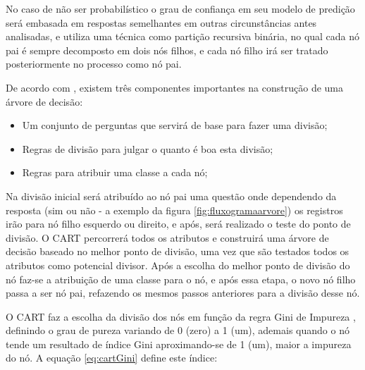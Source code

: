 No caso de não ser probabilístico o grau de confiança em seu modelo de predição será embasada em respostas semelhantes em outras circunstâncias antes analisadas, e utiliza uma técnica como partição recursiva binária, no qual cada nó pai é sempre decomposto em dois nós filhos, e cada nó filho irá ser tratado posteriormente no processo como nó pai.

De acordo com , existem três componentes importantes na construção de uma árvore de decisão:

\begin{itemize}
[noitemsep]
 \item Um conjunto de perguntas que servirá de base para fazer uma divisão;
 \item Regras de divisão para julgar o quanto é boa esta divisão;
 \item Regras para atribuir uma classe a cada nó;
\end{itemize}

Na divisão inicial será atribuído ao nó pai uma questão onde dependendo da resposta (sim ou não - a exemplo da figura \ref{fig:fluxogramaarvore}) os registros irão para nó filho esquerdo ou direito, e após, será realizado o teste do ponto de divisão. O CART percorrerá todos os atributos e construirá uma árvore de decisão baseado no melhor ponto de divisão, uma vez que são testados todos os atributos como potencial divisor. Após a escolha do melhor ponto de divisão do nó faz-se a atribuição de uma classe para o nó, e após essa etapa, o novo nó filho passa a ser nó pai, refazendo os mesmos passos anteriores para a divisão desse nó.

O CART faz a escolha da divisão dos nós em função da regra Gini de Impureza  \cite{breiman1984}, definindo o grau de pureza variando de 0 (zero) a 1 (um), ademais quando o nó tende um resultado de índice Gini aproximando-se de 1 (um), maior a impureza do nó. A equação \ref{eq:cartGini} define este índice:

